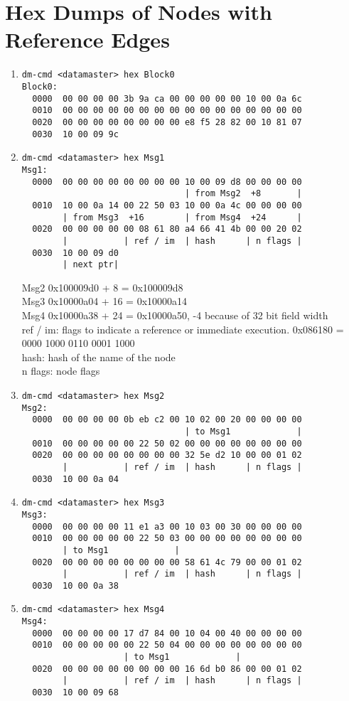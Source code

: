\documentclass[12pt,a4paper]{report}
\begin{document}
\chapter{Hex Dumps of Nodes with Reference Edges}
\begin{enumerate}
\item
\begin{verbatim}
dm-cmd <datamaster> hex Block0
Block0:
  0000  00 00 00 00 3b 9a ca 00 00 00 00 00 10 00 0a 6c
  0010  00 00 00 00 00 00 00 00 00 00 00 00 00 00 00 00
  0020  00 00 00 00 00 00 00 00 e8 f5 28 82 00 10 81 07
  0030  10 00 09 9c
\end{verbatim}
\item
\begin{verbatim}
dm-cmd <datamaster> hex Msg1
Msg1:
  0000  00 00 00 00 00 00 00 00 10 00 09 d8 00 00 00 00
                                | from Msg2  +8       |
  0010  10 00 0a 14 00 22 50 03 10 00 0a 4c 00 00 00 00
        | from Msg3  +16        | from Msg4  +24      |
  0020  00 00 00 00 00 08 61 80 a4 66 41 4b 00 00 20 02
        |           | ref / im  | hash      | n flags |
  0030  10 00 09 d0
        | next ptr|
\end{verbatim}
Msg2 0x100009d0 + 8 = 0x100009d8\\
Msg3 0x10000a04 + 16 = 0x10000a14\\
Msg4 0x10000a38 + 24 = 0x10000a50, -4 because of 32 bit field width \\
ref / im: flags to indicate a reference or immediate execution. 0x086180 = 0000 1000 0110 0001 1000\\
hash: hash of the name of the node\\
n flags: node flags
\item
\begin{verbatim}
dm-cmd <datamaster> hex Msg2
Msg2:
  0000  00 00 00 00 0b eb c2 00 10 02 00 20 00 00 00 00
                                | to Msg1             |
  0010  00 00 00 00 00 22 50 02 00 00 00 00 00 00 00 00
  0020  00 00 00 00 00 00 00 00 32 5e d2 10 00 00 01 02
        |           | ref / im  | hash      | n flags |
  0030  10 00 0a 04
\end{verbatim}
\item
\begin{verbatim}
dm-cmd <datamaster> hex Msg3
Msg3:
  0000  00 00 00 00 11 e1 a3 00 10 03 00 30 00 00 00 00
  0010  00 00 00 00 00 22 50 03 00 00 00 00 00 00 00 00
        | to Msg1             |
  0020  00 00 00 00 00 00 00 00 58 61 4c 79 00 00 01 02
        |           | ref / im  | hash      | n flags |
  0030  10 00 0a 38
\end{verbatim}
\item
\begin{verbatim}
dm-cmd <datamaster> hex Msg4
Msg4:
  0000  00 00 00 00 17 d7 84 00 10 04 00 40 00 00 00 00
  0010  00 00 00 00 00 22 50 04 00 00 00 00 00 00 00 00
                    | to Msg1             |
  0020  00 00 00 00 00 00 00 00 16 6d b0 86 00 00 01 02
        |           | ref / im  | hash      | n flags |
  0030  10 00 09 68
\end{verbatim}
\end{enumerate}
\end{document}
